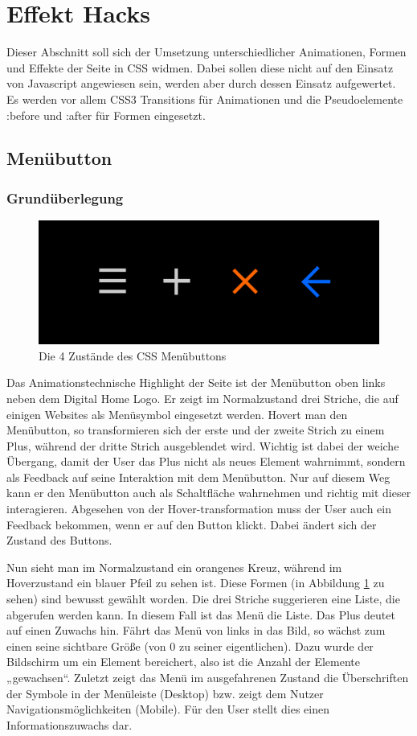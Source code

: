 \section{Effekt Hacks}

Dieser Abschnitt soll sich der Umsetzung unterschiedlicher Animationen, Formen und Effekte der Seite in CSS widmen. Dabei sollen diese nicht auf den Einsatz von Javascript angewiesen sein, werden aber durch dessen Einsatz aufgewertet.
Es werden vor allem CSS3 Transitions für Animationen und die Pseudoelemente :before und :after für Formen eingesetzt.
\subsection{Menübutton}
\subsubsection{Grundüberlegung}

\begin{figure} [h]
\includegraphics[width=\textwidth]{./img/css_buttons1.png}
\caption{Die 4 Zustände des CSS Menübuttons}
\label{css_buttons1}
\end{figure}

Das Animationstechnische Highlight der Seite ist der Menübutton oben links neben dem Digital Home Logo. Er zeigt im Normalzustand drei Striche, die auf einigen Websites als Menüsymbol eingesetzt werden. Hovert man den Menübutton, so transformieren sich der erste und der zweite Strich zu einem Plus, während der dritte Strich ausgeblendet wird. Wichtig ist dabei der weiche Übergang, damit der User das Plus nicht als neues Element wahrnimmt, sondern als Feedback auf seine Interaktion mit dem Menübutton. Nur auf diesem Weg kann er den Menübutton auch als Schaltfläche wahrnehmen und richtig mit dieser interagieren. Abgesehen von der Hover-transformation muss der User auch ein Feedback bekommen, wenn er auf den Button klickt. Dabei ändert sich der Zustand des Buttons.

Nun sieht man im Normalzustand ein orangenes Kreuz, während im Hoverzustand ein blauer Pfeil zu sehen ist. Diese Formen (in Abbildung \ref{css_buttons1} zu sehen) sind bewusst gewählt worden. Die drei Striche suggerieren eine Liste, die abgerufen werden kann. In diesem Fall ist das Menü die Liste. Das Plus deutet auf einen Zuwachs hin. Fährt das Menü von links in das Bild, so wächst zum einen seine sichtbare Größe (von 0 zu seiner eigentlichen). Dazu wurde der Bildschirm um ein Element bereichert, also ist die Anzahl der Elemente „gewachsen“. Zuletzt zeigt das Menü im ausgefahrenen Zustand die Überschriften der Symbole in der Menüleiste (Desktop) bzw. zeigt dem Nutzer Navigationsmöglichkeiten (Mobile). Für den User stellt dies einen Informationszuwachs dar.

